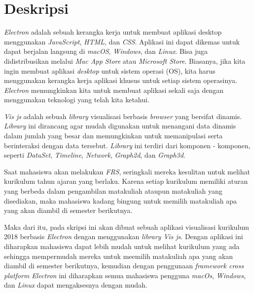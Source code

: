 \documentclass[a4paper,twoside]{article}
\begin{document}
\title{\@judultopik}
\author{\nama \textendash \@npm} 

\newcommand{\nama}{Joshua Delavo}
\newcommand{\@npm}{2017730028}
\newcommand{\@judultopik}{Visualisasi Kurikulum 2018 dengan vis.js dan Electron} %
\newcommand{\jumpemb}{1} %
\newcommand{\tanggal}{12/03/2021}


\maketitle


\section{Deskripsi}

\textit{Electron} adalah sebuah kerangka kerja untuk membuat aplikasi desktop menggunakan \textit{JavaScript}, \textit{HTML}, dan \textit{CSS}. Aplikasi ini dapat dikemas untuk dapat berjalan langsung di \textit{macOS}, \textit{Windows}, dan \textit{Linux}. Bisa juga didistribusikan melalui \textit{Mac App Store} atau \textit{Microsoft Store}. Biasanya, jika kita ingin membuat aplikasi \textit{desktop} untuk sistem operasi (OS), kita harus menggunakan kerangka kerja aplikasi khusus untuk setiap sistem operasinya. \textit{Electron} memungkinkan kita untuk membuat aplikasi sekali saja dengan menggunakan teknologi yang telah kita ketahui.

\textit{Vis js} adalah sebuah \textit{library} visualisasi berbasis \textit{browser} yang bersifat dinamis. \textit{Library} ini dirancang agar mudah digunakan untuk menangani data dinamis dalam jumlah yang besar dan memungkinkan untuk memanipulasi serta berinteraksi dengan data tersebut. \textit{Library} ini terdiri dari komponen - komponen, seperti \textit{DataSet}, \textit{Timeline}, \textit{Network}, \textit{Graph2d}, dan \textit{Graph3d}.

Saat mahasiswa akan melakukan \textit{FRS}, seringkali mereka kesulitan untuk melihat kurikulum tahun ajaran yang berlaku. Karena setiap kurikulum memiliki aturan yang berbeda dalam pengambilan matakuliah ataupun matakuliah yang disediakan, maka mahasiswa kadang bingung untuk memilih matakuliah apa yang akan diambil di semester berikutnya.

Maka dari itu, pada skripsi ini akan dibuat sebuah aplikasi visualisasi kurikulum 2018 berbasis \textit{Electron} dengan menggunakan \textit{library Vis js}. Dengan aplikasi ini diharapkan mahasiswa dapat lebih mudah untuk melihat kurikulum yang ada sehingga mempermudah mereka untuk meemilih matakuliah apa yang akan diambil di semester berikutnya, kemudian dengan penggunaan \textit{framework cross platform Electron} ini diharapkan semua mahasiswa pengguna \textit{macOs}, \textit{Windows}, dan \textit{Linux} dapat mengaksesnya dengan mudah.
\end{document}
